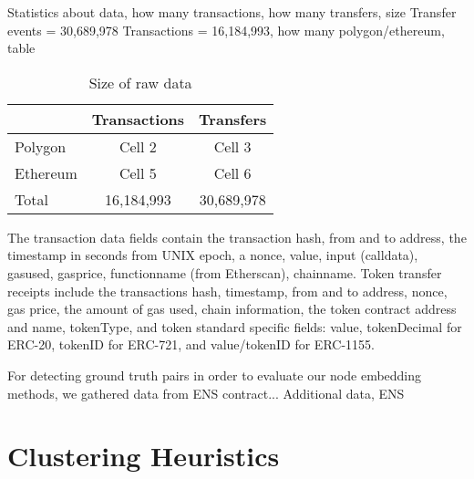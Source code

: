 \documentclass[12pt,a4paper,titlepage,oneside,english]{article}
\begin{document}
Statistics about data, how many transactions, how many transfers, size
Transfer events = 30,689,978
Transactions = 16,184,993, how many polygon/ethereum, table

\begin{table}[h]
\centering
\begin{tabular}{lcc}
\hline \hline
  & Transactions & Transfers \\
 \hline
 Polygon & Cell 2 & Cell 3 \\
 Ethereum & Cell 5 & Cell 6 \\
 \hline
 Total & 16,184,993 & 30,689,978 \\
 \hline \hline
\end{tabular}
\caption{Size of raw data}
\label{tab:data_size}
\end{table}


The transaction data fields contain the transaction hash, from and to address, the timestamp in seconds from UNIX epoch, a nonce, value, input (calldata), gasused, gasprice, functionname (from Etherscan), chainname.
Token transfer receipts include the transactions hash, timestamp, from and to address, nonce, gas price, the amount of gas used, chain information, the token contract address and name, tokenType, and token standard specific fields: value, tokenDecimal for ERC-20, tokenID for ERC-721, and value/tokenID for ERC-1155.



For detecting ground truth pairs in order to evaluate our node embedding methods, we gathered data from ENS contract...
Additional data, ENS \\



\section{Clustering Heuristics}
\end{document}

